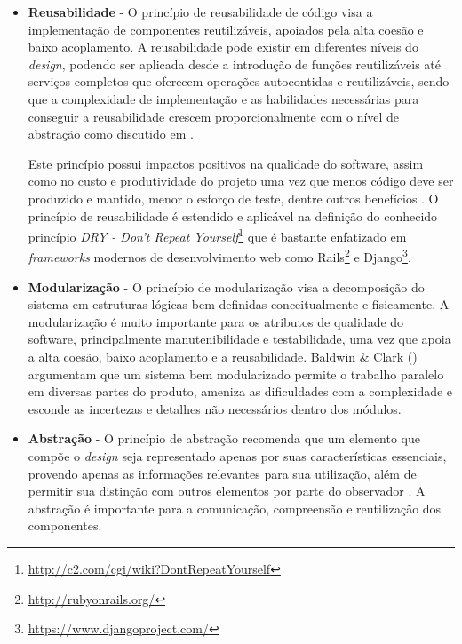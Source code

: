 \begin{itemize}

\item \textbf{Reusabilidade} - O princípio de reusabilidade de código visa a implementação de componentes reutilizáveis, apoiados pela alta coesão e baixo acoplamento.
%
A reusabilidade pode existir em diferentes níveis do \emph{design}, podendo ser aplicada desde a introdução de funções reutilizáveis até serviços completos que oferecem operações autocontidas e reutilizáveis, sendo que a complexidade de implementação e as habilidades necessárias para conseguir a reusabilidade crescem proporcionalmente com o nível de abstração como discutido em \cite{cruise2007}.

Este princípio possui impactos positivos na qualidade do software, assim como no custo e produtividade do projeto uma vez que menos código deve ser produzido e mantido, menor o esforço de teste, dentre outros benefícios \cite{sametinger1997}.
%
O princípio de reusabilidade é estendido e aplicável na definição do conhecido princípio \emph{DRY - Don't Repeat Yourself}\footnote{\url{http://c2.com/cgi/wiki?DontRepeatYourself}} que é bastante enfatizado em \emph{frameworks} modernos de desenvolvimento web como Rails\footnote{\url{http://rubyonrails.org/}} e Django\footnote{\url{https://www.djangoproject.com/}}.
%
\item \textbf{Modularização} - O princípio de modularização visa a decomposição do sistema em estruturas lógicas bem definidas conceitualmente e fisicamente.
%
A modularização é muito importante para os atributos de qualidade do software, principalmente manutenibilidade e testabilidade, uma vez que apoia a alta coesão, baixo acoplamento e a reusabilidade.
%
Baldwin \& Clark (\citeyear{baldwin2000}) argumentam que um sistema bem modularizado permite o trabalho paralelo em diversas partes do produto, ameniza as dificuldades com a complexidade e esconde as incertezas e detalhes não necessários dentro dos módulos.
%
\item \textbf{Abstração} - O princípio de abstração recomenda que um elemento que compõe o \emph{design} seja representado apenas por suas características essenciais, provendo apenas as informações relevantes  para sua utilização, além de permitir sua distinção com outros elementos por parte do observador \cite{germoglio2009}.
%
A abstração é importante para a comunicação, compreensão e reutilização dos componentes.


\end{itemize}
